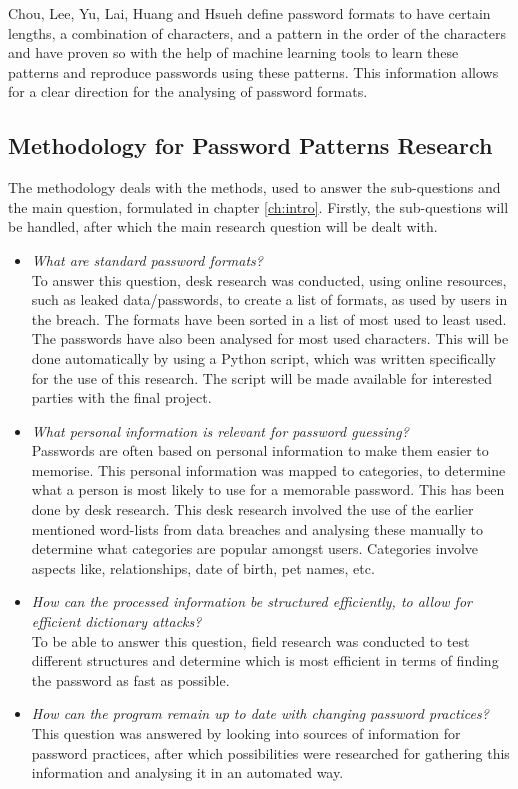 \documentclass[a4paper,12pt]{article}
\begin{document}
Chou, Lee, Yu, Lai, Huang and Hsueh \cite{bib:pform} define password formats to have certain lengths, a combination of characters, and a pattern in the order of the characters and have proven so with the help of machine learning tools to learn these patterns and reproduce passwords using these patterns. This information allows for a clear direction for the analysing of password formats.

\subsection{Methodology for Password Patterns Research}
The methodology deals with the methods, used to answer the sub-questions and the main question, formulated in chapter \ref{ch:intro}. Firstly, the sub-questions will be handled, after which the main research question will be dealt with.

\begin{itemize}
\item \textit{What are standard password formats?}\\
  To answer this question, desk research was conducted, using online resources, such as leaked data/passwords, to create a list of formats, as used by users in the breach. The formats have been sorted in a list of most used to least used. The passwords have also been analysed for most used characters. This will be done automatically by using a Python script, which was written specifically for the use of this research. The script will be made available for interested parties with the final project.
  
\item \textit{What personal information is relevant for password guessing?}\\
  Passwords are often based on personal information to make them easier to memorise. This personal information was mapped to categories, to determine what a person is most likely to use for a memorable password. This has been done by desk research. This desk research involved the use of the earlier mentioned word-lists from data breaches and analysing these manually to determine what categories are popular amongst users. Categories involve aspects like, relationships, date of birth, pet names, etc.
  
\item \textit{How can the processed information be structured efficiently, to allow for efficient dictionary attacks?}\\
  To be able to answer this question, field research was conducted to test different structures and determine which is most efficient in terms of finding the password as fast as possible.

\item \textit{How can the program remain up to date with changing password practices?}\\
  This question was answered by looking into sources of information for password practices, after which possibilities were researched for gathering this information and analysing it in an automated way.
\end{itemize}
\end{document}

